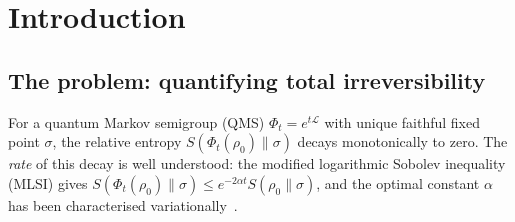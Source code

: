 \documentclass[11pt,a4paper]{article}
\theoremstyle{definition}
\theoremstyle{remark}
\DeclareMathOperator{\EP}{EP}
\newcommand{\LL}{\mathcal{L}}
\begin{document}
\begin{abstract}
All hypotheses are stated precisely: for general
MLSI semigroups we prove $\mathcal{J} \ge S(\rho_0\|\sigma)/(2\Lambda)$;
the sharp KL Cram\'er--Rao inequality
$\mathcal{J}\!\cdot\!\EP \ge S^2$ holds under log-convex entropy decay
(Definition~\ref{def:LCD}), and we classify exactly when it holds
universally ($d = 2$, $\sigma = I/2$; Theorem~\ref{thm:LCD-class}).
We show that $\mathcal{J}$ is superadditive for tensor-product
generators, with the excess given by the time-integrated mutual
information.  We establish two physical interpretations: the
displacement functional bounds the total ergotropy
(extractable work) lost during thermalisation, and the
$\chi^2$-displacement equals half the static susceptibility,
making the $\chi^2$-TUR equivalent to the time--bandwidth
uncertainty principle $\tau_C\cdot\gamma_C \ge 1$.
We demonstrate protocol-independent thermalization time bounds for 
trapped ion qubits and provide efficient computational algorithms.
All proofs are complete and no external physical
framework is assumed.
\medskip\noindent\textbf{Keywords:} Quantum Markov semigroup,
Log-Sobolev inequality, Detailed balance, Relative entropy,
Thermodynamic uncertainty relation.

\medskip\noindent\textbf{MSC 2020:} 46L55, 81S22, 47D07, 94A17.
\end{abstract}



\section{Introduction}\label{sec:intro}

\subsection{The problem: quantifying total irreversibility}

For a quantum Markov semigroup (QMS) $\Phi_t = e^{t\LL}$ with unique
faithful fixed point $\sigma$, the relative entropy
$S(\Phi_t(\rho_0)\|\sigma)$ decays monotonically to zero.  The
\emph{rate} of this decay is well understood: the modified logarithmic
Sobolev inequality (MLSI) gives
$S(\Phi_t(\rho_0)\|\sigma) \le e^{-2\alpha t}S(\rho_0\|\sigma)$,
and the optimal constant $\alpha$ has been characterised
variationally~\cite{KastoryanoTemme2013,MullerHermesFranca2018,CarlenMaas2017,Bardet2024}.
\end{document}
